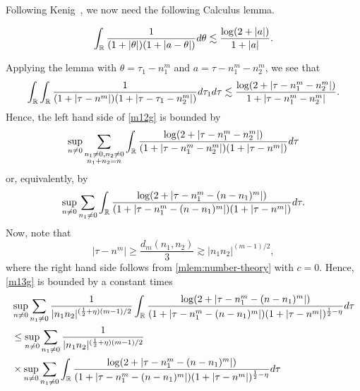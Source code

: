 %
%
Following Kenig~\cite{Kenig:1996yn}, we now need the following Calculus lemma.
%
%
%
%
%
%
%
%
\begin{lemma}
	\label{mlem:calc}
 \begin{equation}
	 \label{mcalc}
	 \begin{split}
		 \int_{\mathbb{R}} \frac{1}{(1 + | \theta |)(1 + | a - \theta |)} d \theta \lesssim
		 \frac{\log(2 + | a |)}{1 + | a |}.
	 \end{split}
 \end{equation}
 \end{lemma}
%
%
Applying the lemma with $\theta = \tau_1 - n_1^m$ and $a = \tau - n_1^m -
n_2^m$, we see that
%
%
\begin{equation*}
	\begin{split}
	\int_{\mathbb{R}}
		\int_{\mathbb{R}}  \frac{1}{(1 + | \tau - n^m |)(1 + | \tau - \tau_1 -
		n_2^m |)} d \tau_1 d \tau \lesssim \frac{\log(2 + | \tau - n_{1}^m -
		n_{2}^m |)}{1 + | \tau - n_{1}^m - n_{2}^m |}.
	\end{split}
\end{equation*}
%
%
%
Hence, the left hand side of \eqref{m12g} is bounded by
%
\begin{equation*}
	\begin{split}
		\sup_{n \neq 0} \sum_{\substack{n_1 \neq 0, n_2 \neq 0 \\n_1 +n_2 =n}}
		\int_{\mathbb{R}} \frac{\log(2 + | \tau - n_{1}^m -
		n_{2}^m |)}{(1 + | \tau - n_{1}^m - n_{2}^m |)(1 + | \tau - n^m |)}
		d \tau	
	\end{split}
\end{equation*}
%
%
or, equivalently, by
%
%
\begin{equation}
	\label{m13g}
	\begin{split}
		\sup_{n \neq 0} \sum_{n_1 \neq 0} \int_{\mathbb{R}} \frac{\log(2 + | \tau -
		n_{1}^m - (n - n_1)^m |)}{(1 + | \tau - n_{1}^m - (n - n_{1})^m |)(1
		+ | \tau - n^m |)} d \tau.
	\end{split}
\end{equation}
%
%
%
Now, note that 
$$ |\tau - n^m| \ge \frac{d_m(n_1, n_2)}{3} \gtrsim
| n_1 n_2 |^{(m-1)/2},$$ where the right hand side follows from
\cref{mlem:number-theory} with $c=0$. Hence, \eqref{m13g} is bounded by a constant times
%
%
%
%
\begin{equation}
	\label{m14g}
	\begin{split}
		& \sup_{n \neq 0} \sum_{n_1 \neq 0}
		\frac{1}{| n_1 n_2 |^{(\frac{1}{2} + \eta)(m-1)/2}} \int_{\mathbb{R}} \frac{\log(2 + | \tau - n_{1}^m -
		(n - n_1)^m |)}{(1 + | \tau - n_{1}^m - (n - n_{1})^m
		|)(1 + | \tau - n^m |)^{\frac{1}{2}-\eta}}
		d \tau
		\\
		& \le \sup_{n \neq 0} \sum_{n_1 \neq 0}
		\frac{1}{| n_1 n_2 |^{(\frac{1}{2} + \eta)(m-1)/2}} 	\\
		& \times \sup_{n \neq 0} \sum_{n_1 \neq 0}
		\int_{\mathbb{R}} \frac{\log(2 + | \tau
		- n_{1}^m - (n - n_1)^m |)}{(1 + | \tau - n_{1}^m - (n - n_{1})^m
		|)(1 + | \tau - n^m |)^{\frac{1}{2}-\eta}}
		d \tau
	\end{split}
\end{equation}
